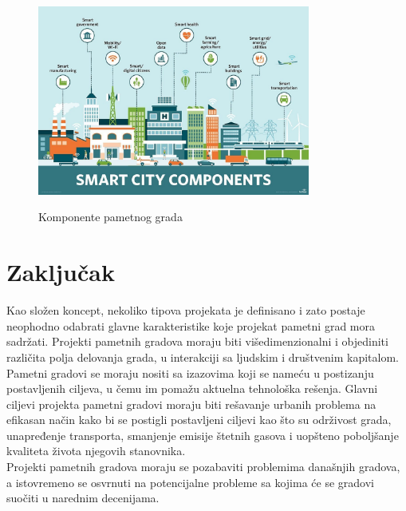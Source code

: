 \documentclass[a4paper,12pt]{article}
\begin{document}
{\begin{figure}[h!]
    \centering
    \includegraphics[width=0.8\textwidth]{pametni grad}
    \caption{Komponente pametnog grada}\cite{referenca5}
    \label{fig:slika}
\end{figure}






\section{Zaključak}
\label{sec:zakljucak}

Kao složen koncept, nekoliko tipova projekata je definisano i zato postaje neophodno odabrati glavne karakteristike koje projekat pametni grad mora sadržati. Projekti pametnih gradova moraju biti višedimenzionalni i objediniti različita polja delovanja grada, u interakciji sa ljudskim i društvenim kapitalom. Pametni gradovi se moraju nositi sa izazovima koji se nameću u postizanju postavljenih ciljeva, u čemu im pomažu aktuelna tehnološka rešenja. Glavni ciljevi projekta pametni gradovi moraju biti rešavanje urbanih problema na efikasan način kako bi se postigli postavljeni ciljevi kao što su održivost grada, unapređenje transporta, smanjenje emisije štetnih gasova i uopšteno poboljšanje kvaliteta života njegovih stanovnika.\cite{referenca6}  \\

Projekti pametnih gradova moraju se pozabaviti problemima današnjih gradova, a istovremeno se osvrnuti na potencijalne probleme sa kojima će se gradovi suočiti u narednim decenijama. \\


\appendix

}
\end{document}
